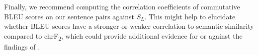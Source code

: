 \documentclass[11pt,a4paper]{article}
\begin{document}
Finally, we recommend computing the correlation coefficients of commutative BLEU scores on our sentence pairs against $S_L$. This might help to elucidate whether BLEU scores have a stronger or weaker correlation to semantic similarity compared to chrF\textsubscript{2}, which could provide additional evidence for or against the findings of \citet{michel2019evaluation}.  




\end{document}

